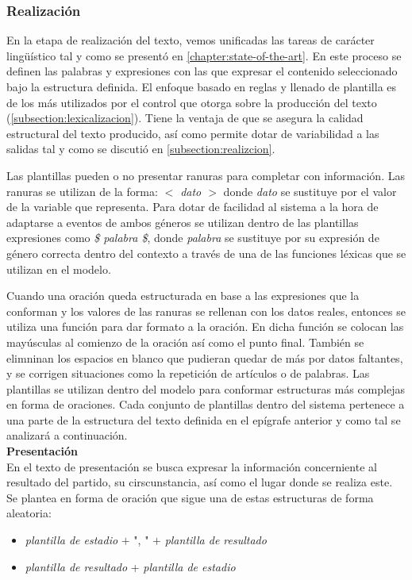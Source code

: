 \subsubsection{Realización}

    En la etapa de realización del texto, vemos unificadas las tareas de carácter lingüístico tal y como se presentó en \ref{chapter:state-of-the-art}. 
En este proceso se definen las palabras y expresiones con las que expresar el contenido seleccionado bajo la estructura definida. El enfoque basado en reglas 
y llenado de plantilla es de los más utilizados por el control que otorga sobre la producción del texto (\ref{subsection:lexicalizacion}). Tiene la ventaja de que 
se asegura la calidad estructural del texto producido, así como permite dotar de variabilidad a las salidas tal y como se discutió en \ref{subsection:realizcion}.

    Las plantillas pueden o no presentar ranuras para completar con información. Las ranuras se utilizan de la forma: \textit{$<$ dato $>$} donde 
\textit{dato} se sustituye por el valor de la variable que representa. Para dotar de facilidad al sistema a la hora de adaptarse a eventos de 
ambos géneros se utilizan dentro de las plantillas expresiones como \textit{\$ palabra \$}, donde \textit{palabra} se sustituye por su expresión de 
género correcta dentro del contexto a través de una de las funciones léxicas que se utilizan en el modelo. 

    Cuando una oración queda estructurada en base a las expresiones que la conforman y los valores de las ranuras se rellenan con los datos reales, entonces 
se utiliza una función para dar formato a la oración. En dicha función se colocan las mayúsculas al comienzo de la oración así como el punto final. También se 
elimninan los espacios en blanco que pudieran quedar de más por datos faltantes, y se corrigen situaciones como la repetición de artículos o de palabras.
    Las plantillas se utilizan dentro del modelo para conformar estructuras más complejas en forma de 
oraciones. Cada conjunto de plantillas dentro del sistema pertenece a una parte de la estructura del texto definida en el ep\'igrafe anterior y como 
tal se analizará a continuación.\\

    \textbf{Presentación}\\

    En el texto de presentación se busca expresar la información concerniente al resultado del partido, su cirscunstancia, así como el lugar donde se 
realiza este. Se plantea en forma de oración que sigue una de estas estructuras de forma aleatoria:
    \begin{itemize}
        \item \textit{plantilla de estadio} $+$ ", " $+$ \textit{plantilla de resultado}
        \item \textit{plantilla de resultado} + \textit{plantilla de estadio}
    \end{itemize}
        
